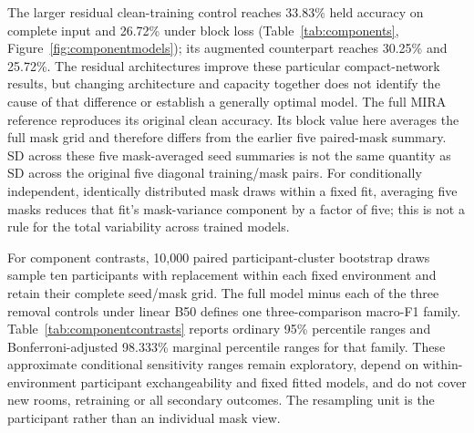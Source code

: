 The larger residual clean-training control reaches 33.83\% held accuracy on complete input and 26.72\% under block loss (Table~\ref{tab:components}, Figure~\ref{fig:componentmodels}); its augmented counterpart reaches 30.25\% and 25.72\%. The residual architectures improve these particular compact-network results, but changing architecture and capacity together does not identify the cause of that difference or establish a generally optimal model. The full MIRA reference reproduces its original clean accuracy. Its block value here averages the full mask grid and therefore differs from the earlier five paired-mask summary. SD across these five mask-averaged seed summaries is not the same quantity as SD across the original five diagonal training/mask pairs. For conditionally independent, identically distributed mask draws within a fixed fit, averaging five masks reduces that fit's mask-variance component by a factor of five; this is not a rule for the total variability across trained models.

For component contrasts, 10,000 paired participant-cluster bootstrap draws sample ten participants with replacement within each fixed environment and retain their complete seed/mask grid. The full model minus each of the three removal controls under linear B50 defines one three-comparison macro-F1 family. Table~\ref{tab:componentcontrasts} reports ordinary 95\% percentile ranges and Bonferroni-adjusted 98.333\% marginal percentile ranges for that family. These approximate conditional sensitivity ranges remain exploratory, depend on within-environment participant exchangeability and fixed fitted models, and do not cover new rooms, retraining or all secondary outcomes. The resampling unit is the participant rather than an individual mask view.

